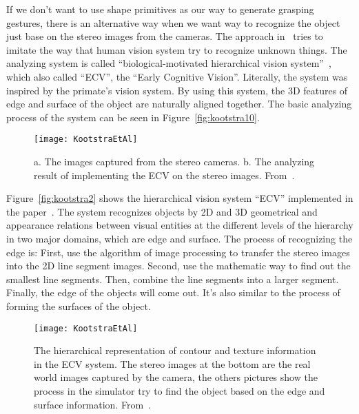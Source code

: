 If we don’t want to use shape primitives as our way to generate grasping gestures, there is an alternative way when we want way to recognize the object just base on the stereo images from the cameras. The approach in~\cite{kootstra} tries to imitate the way that human vision system try to recognize unknown things. The analyzing system is called “biological-motivated hierarchical vision system”~\cite{pugeault}, which also called “ECV”, the “Early Cognitive Vision”. Literally, the system was inspired by the primate’s vision system. By using this system, the 3D features of edge and surface of the object are naturally aligned together. The basic analyzing process of the system can be seen in Figure~\vref{fig:kootstra10}. 

\begin{figure}
	\centering
	\texttt{[image: KootstraEtAl]}
	\caption{a. The images captured from the stereo cameras. b. The analyzing result of implementing the ECV on the stereo images. From~\cite{kootstra}.}
	\label{fig:kootstra10}
\end{figure}

Figure~\vref{fig:kootstra2} shows the hierarchical vision system “ECV” implemented in the paper~\cite{kootstra}. The system recognizes objects by 2D and 3D geometrical and appearance relations between visual entities at the different levels of the hierarchy in two major domains, which are edge and surface. The process of recognizing the edge is: First, use the algorithm of image processing to transfer the stereo images into the 2D line segment images. Second, use the mathematic way to find out the smallest line segments. Then, combine the line segments into a larger segment. Finally, the edge of the objects will come out. It’s also similar to the process of forming the surfaces of the object. 

\begin{figure}
	\centering
	\texttt{[image: KootstraEtAl]}
	\caption{The hierarchical representation of contour and texture information in the ECV system. The stereo images at the bottom are the real world images captured by the camera, the others pictures show the process in the simulator try to find the object based on the edge and surface information. From~\cite{kootstra}.}
	\label{fig:kootstra2}
\end{figure}